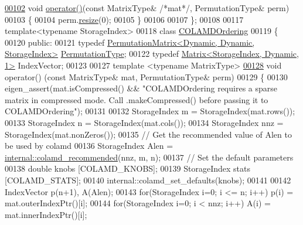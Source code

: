 \begin{DoxyCode}
\hyperlink{group___ordering_methods___module_aa39e772105ed66da9e909f2a9385be37}{00102}     \textcolor{keywordtype}{void} \hyperlink{group___ordering_methods___module_aa39e772105ed66da9e909f2a9385be37}{operator()}(\textcolor{keyword}{const} MatrixType& \textcolor{comment}{/*mat*/}, PermutationType& perm)
00103     \{
00104       perm.\hyperlink{group___core___module_a0e0fda6e84d69e02432e4770359bb532}{resize}(0); 
00105     \}
00106     
00107 \};
00108 
00117 \textcolor{keyword}{template}<\textcolor{keyword}{typename} StorageIndex>
00118 \textcolor{keyword}{class }\hyperlink{group___ordering_methods___module_class_eigen_1_1_c_o_l_a_m_d_ordering}{COLAMDOrdering}
00119 \{
00120   \textcolor{keyword}{public}:
00121     \textcolor{keyword}{typedef} \hyperlink{group___core___module}{PermutationMatrix<Dynamic, Dynamic, StorageIndex>}
       \hyperlink{group___core___module}{PermutationType}; 
00122     \textcolor{keyword}{typedef} \hyperlink{group___core___module}{Matrix<StorageIndex, Dynamic, 1>} IndexVector;
00123     
00127     \textcolor{keyword}{template} <\textcolor{keyword}{typename} MatrixType>
\hyperlink{group___ordering_methods___module_a708cb20191dcd79856d922f262405946}{00128}     \textcolor{keywordtype}{void} operator() (\textcolor{keyword}{const} MatrixType& mat, PermutationType& perm)
00129     \{
00130       eigen\_assert(mat.isCompressed() && \textcolor{stringliteral}{"COLAMDOrdering requires a sparse matrix in compressed mode. Call
       .makeCompressed() before passing it to COLAMDOrdering"});
00131       
00132       StorageIndex m = StorageIndex(mat.rows());
00133       StorageIndex n = StorageIndex(mat.cols());
00134       StorageIndex nnz = StorageIndex(mat.nonZeros());
00135       \textcolor{comment}{// Get the recommended value of Alen to be used by colamd}
00136       StorageIndex Alen = \hyperlink{namespace_eigen_1_1internal_a182742cb4291838dfc4cd1e5b2b95c65}{internal::colamd\_recommended}(nnz, m, n); 
00137       \textcolor{comment}{// Set the default parameters}
00138       \textcolor{keywordtype}{double} knobs [COLAMD\_KNOBS]; 
00139       StorageIndex stats [COLAMD\_STATS];
00140       internal::colamd\_set\_defaults(knobs);
00141       
00142       IndexVector p(n+1), A(Alen); 
00143       \textcolor{keywordflow}{for}(StorageIndex i=0; i <= n; i++)   p(i) = mat.outerIndexPtr()[i];
00144       \textcolor{keywordflow}{for}(StorageIndex i=0; i < nnz; i++)  A(i) = mat.innerIndexPtr()[i];

\end{DoxyCode}
